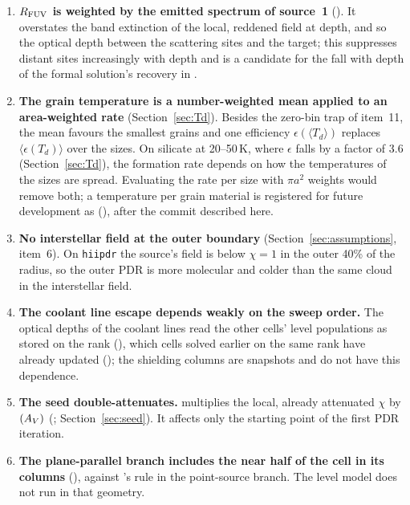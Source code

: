 \begin{enumerate}
  and evaluating the shielding per source would remove it.
\item \textbf{$R_{\mathrm{FUV}}$ is weighted by the emitted spectrum of source~1}
  (). It overstates the band extinction of the
  local, reddened field at depth, and so the optical depth between the
  scattering sites and the target; this suppresses distant sites increasingly
  with depth and is a candidate for the fall with depth of the formal
  solution's recovery in .
\item \textbf{The grain temperature is a number-weighted mean applied to an
  area-weighted rate} (Section~\ref{sec:Td}). Besides the zero-bin trap of
  item~11, the mean favours the smallest grains and one efficiency
  $\epsilon(\langle T_d\rangle)$ replaces $\langle\epsilon(T_d)\rangle$ over the sizes. On
  silicate at 20--50\,K, where $\epsilon$ falls by a factor of 3.6
  (Section~\ref{sec:Td}), the formation rate depends on how the temperatures
  of the sizes are spread. Evaluating the rate per size with $\pi a^2$ weights
  would remove both; a temperature per grain material is registered for
  future development as  (), after the commit described
  here.
\item \textbf{No interstellar field at the outer boundary}
  (Section~\ref{sec:assumptions}, item~6). On \texttt{hiipdr} the source's field
  is below $\chi=1$ in the outer 40\% of the radius, so the outer PDR is more
  molecular and colder than the same cloud in the interstellar field.
\item \textbf{The coolant line escape depends weakly on the sweep order.} The
  optical depths of the coolant lines read the other cells' level populations
  as stored on the rank (), which cells solved
  earlier on the same rank have already updated
  (); the shielding columns are snapshots and do not have
  this dependence.
\item \textbf{The seed double-attenuates.}  multiplies the
  local, already attenuated $\chi$ by $(A_{V})$
  (; Section~\ref{sec:seed}). It affects only the
  starting point of the first PDR iteration.
\item \textbf{The plane-parallel branch includes the near half of the cell in
  its columns} (), against 's rule in
  the point-source branch. The level model does not run in that geometry.

\end{enumerate}
